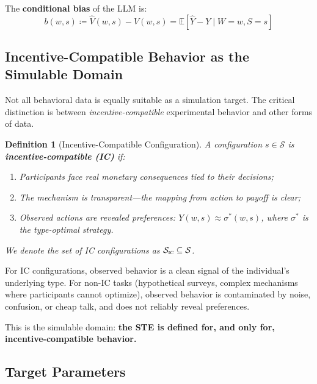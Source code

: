 \documentclass[12pt]{article}
\newtheorem{definition}{Definition}
\newcommand{\E}{\mathbb{E}}
\begin{document}
The \textbf{conditional bias} of the LLM is:
\begin{equation}
  b(w, s) \coloneqq \hat{V}(w, s) - V(w, s) = \E[\hat{Y} - Y \mid W = w, S = s]
\end{equation}

\subsection{Incentive-Compatible Behavior as the Simulable Domain}

Not all behavioral data is equally suitable as a simulation target. The critical distinction is between \textit{incentive-compatible} experimental behavior and other forms of data.

\begin{definition}[Incentive-Compatible Configuration]
\label{def:ic}
A configuration $s \in \mathcal{S}$ is \textbf{incentive-compatible (IC)} if:
\begin{enumerate}
  \item Participants face real monetary consequences tied to their decisions;
  \item The mechanism is transparent---the mapping from action to payoff is clear;
  \item Observed actions are revealed preferences: $Y(w, s) \approx \sigma^*(w, s)$, where $\sigma^*$ is the type-optimal strategy.
\end{enumerate}
We denote the set of IC configurations as $\mathcal{S}_{\textsc{ic}} \subseteq \mathcal{S}$.
\end{definition}

For IC configurations, observed behavior is a clean signal of the individual's underlying type. For non-IC tasks (hypothetical surveys, complex mechanisms where participants cannot optimize), observed behavior is contaminated by noise, confusion, or cheap talk, and does not reliably reveal preferences.

This is the simulable domain: \textbf{the STE is defined for, and only for, incentive-compatible behavior.}

\subsection{Target Parameters}
\end{document}

